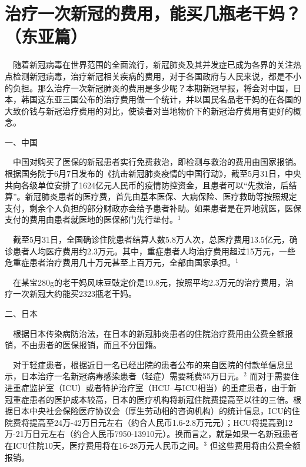 \documentclass[]{article}
\begin{document}
\vspace{-7mm}

\vspace{-5mm}

\section{\texorpdfstring{\textcolor{glaucous}{\Huge 治疗一次新冠的费用，能买几瓶老干妈？（东亚篇）}}{}}\label{section}

\vspace{-3mm}

\(\quad\)随着新冠病毒在世界范围的全面流行，新冠肺炎及其并发症已成为各界的关注热点检测新冠病毒，治疗新冠相关疾病的费用，对于各国政府与人民来说，都是不小的负担。那么治疗一次新冠肺炎的费用是多少呢？本期新冠早报，将会对中国，日本，韩国这东亚三国公布的治疗费用做一个统计，并以国民名品老干妈的在各国的大致价钱与新冠治疗费用的对比，使读者对当地物价下的新冠治疗费用有更好的概念。

一、中国

\(\quad\)中国对购买了医保的新冠患者实行免费救治，即检测与救治的费用由国家报销。根据国务院于6月7日发布的《抗击新冠肺炎疫情的中国行动》，截至5月31日，中央共向各级单位安排了1624亿元人民币的疫情防控资金，且患者可以``先救治，后结算''。新冠肺炎患者的医疗费，首先由基本医保、大病保险、医疗救助等按照规定支付，剩余个人负担的部分财政亦会给予患者补助。如果患者是在异地就医，医保支付的费用由患者就医地的医保部门先行垫付。\(^1\)

\(\quad\)截至5月31日，全国确诊住院患者结算人数5.8万人次，总医疗费用13.5亿元，确诊患者人均医疗费用约2.3万元。其中，重症患者人均治疗费用超过15万元，一些危重症患者治疗费用几十万元甚至上百万元，全部由国家承担。\(^1\)

\(\quad\)在某宝280g的老干妈风味豆豉定价是19.8元，按照平均2.3万元的治疗费用，治疗一次新冠大约能买2323瓶老干妈。

二、日本

\(\quad\)根据日本传染病防治法，在日本的新冠肺炎患者的住院治疗费用由公费全额报销，不由患者的医保报销，而且不分国籍。

\(\quad\)对于轻症患者，根据近日一名已经出院的患者公布的来自医院的付款单信息显示，日本治疗一名新冠病毒感染患者（轻症）需要耗费55万日元。\(^2\)
而对于需要住进重症监护室（ICU）或者特护治疗室（HCU--与ICU相当）的重症患者，由于新冠重症患者的医护成本较高，日本的医疗机构将新冠住院费提高至以往的三倍。根据日本中央社会保险医疗协议会（厚生劳动相的咨询机构）的统计信息，ICU的住院费将提高至24万-42万日元左右（约合人民币1.6-2.8万元元）；HCU将提高到12万-21万日元左右（约合人民币7950-13910元）。换而言之，就是如果一名新冠患者在ICU住院10天，医疗费用将在16-28万元人民币之间。\(^3\)
但这些费用将由公费全额报销。
\end{document}
